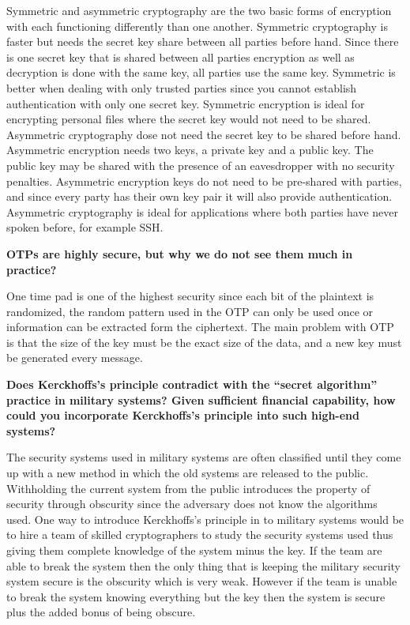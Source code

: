 \documentclass[letterpaper,11pt,notitlepage,fleqn]{article}
\begin{document}
Symmetric and asymmetric cryptography are the two basic forms of encryption with each functioning differently than one another. Symmetric cryptography is faster but needs the secret key share between all parties before hand. Since there is one secret key that is shared between all parties encryption as well as decryption is done with the same key, all parties use the same key. Symmetric is better when dealing with only trusted parties since you cannot
establish authentication with only one secret key. Symmetric encryption is ideal for encrypting personal files where the secret key would not need to be shared.\\
\indent Asymmetric cryptography dose not need the secret key to be shared before hand. Asymmetric encryption needs two keys, a private key and a public key. The public key may be shared with the presence of an eavesdropper with no security penalties. Asymmetric encryption keys do not need to be pre-shared with parties, and since every party has their own key pair it will also provide authentication. Asymmetric cryptography is ideal for applications where both parties have never spoken before, for example SSH. 

\noindent \textbf{OTPs are highly secure, but why we do not see them much in practice?}


One time pad is one of the highest security since each bit of the plaintext is randomized, the random pattern used in the OTP can only be used once or information can be extracted form the ciphertext. The main problem with OTP is that the size of the key must be the exact size of the data, and a new key must be generated every message. 

\noindent \textbf{Does Kerckhoffs's principle contradict with the ``secret algorithm'' practice in military systems? Given sufficient financial capability, how could you incorporate Kerckhoffs's principle into such high-end systems?}

The security systems used in military systems are often classified until they come up with a new method in which the old systems are released to the public. Withholding the current system from the public introduces the property of security through obscurity since the adversary does not know the algorithms used. One way to introduce Kerckhoffs's principle in to military systems would be to hire a team of skilled cryptographers to study the security systems used thus giving them complete knowledge
of the system minus the key. If the team are able to break the system then the only thing that is keeping the military security system secure is the obscurity which is very weak. However if the team is unable to break the system knowing everything but the key then the system is secure plus the added bonus of being obscure.
\end{document}
